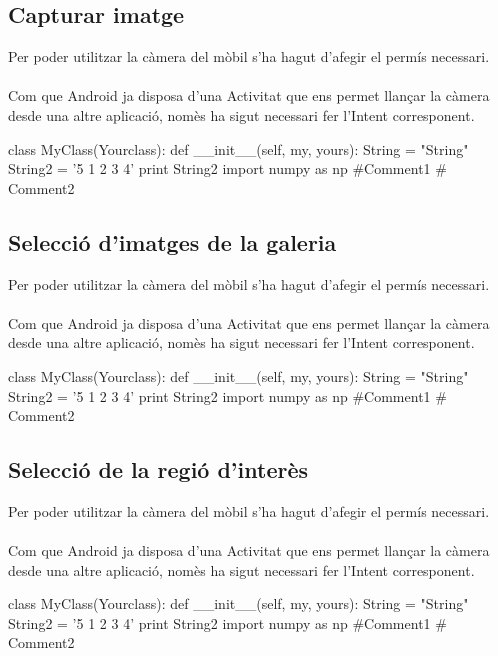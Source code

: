 	\subsection{Capturar imatge}
		Per poder utilitzar la càmera del mòbil s'ha hagut d'afegir el permís necessari.\\\\
		Com que Android ja disposa d'una Activitat que ens permet llançar la càmera desde una altre aplicació, nomès ha sigut necessari fer l'Intent corresponent.\\
		\begin{python}
class MyClass(Yourclass):
  def __init__(self, my, yours):
    String = "String"
    String2 = '5 1 2 3 4'
    print String2
import numpy as np #Comment1
  # Comment2
		\end{python}
	\subsection{Selecció d'imatges de la galeria}
		Per poder utilitzar la càmera del mòbil s'ha hagut d'afegir el permís necessari.\\\\
		Com que Android ja disposa d'una Activitat que ens permet llançar la càmera desde una altre aplicació, nomès ha sigut necessari fer l'Intent corresponent.\\
		\begin{python}
class MyClass(Yourclass):
  def __init__(self, my, yours):
    String = "String"
    String2 = '5 1 2 3 4'
    print String2
import numpy as np #Comment1
  # Comment2
		\end{python}
	\subsection{Selecció de la regió d'interès}
		Per poder utilitzar la càmera del mòbil s'ha hagut d'afegir el permís necessari.\\\\
		Com que Android ja disposa d'una Activitat que ens permet llançar la càmera desde una altre aplicació, nomès ha sigut necessari fer l'Intent corresponent.\\
		\begin{python}
class MyClass(Yourclass):
  def __init__(self, my, yours):
    String = "String"
    String2 = '5 1 2 3 4'
    print String2
import numpy as np #Comment1
  # Comment2
		\end{python}
